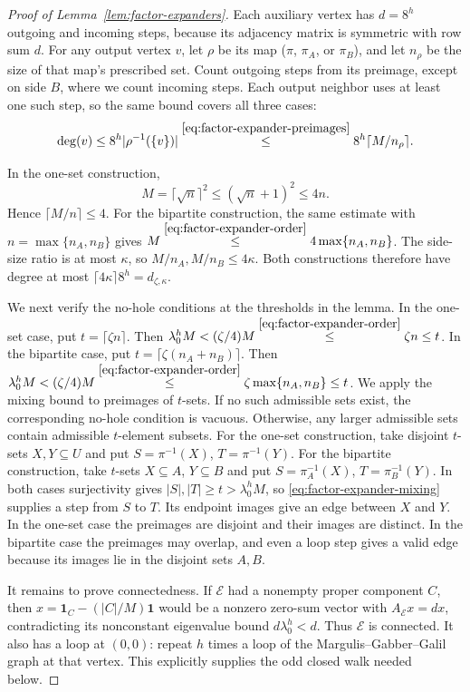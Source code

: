\begin{proof}[Proof of Lemma~\ref{lem:factor-expanders}]
Each auxiliary vertex has $d=8^h$ outgoing and incoming steps,
because its adjacency matrix is symmetric with row sum $d$.
For any output vertex $v$, let $\rho$ be its map ($\pi$, $\pi_A$,
or $\pi_B$), and let $n_\rho$ be the size of that map's prescribed
set. Count outgoing steps from its preimage, except on side $B$,
where we count incoming steps. Each output neighbor uses at least
one such step, so the same bound covers all three cases:
\[
 \deg(v)\le8^h|\rho^{-1}(\{v\})|
 \overset{\eqref{eq:factor-expander-preimages}}{\leq}
 8^h\lceil M/n_\rho\rceil.
\]

In the one-set construction,
\begin{equation}\label{eq:factor-expander-order}
 M=\lceil\sqrt n\rceil^2\le(\sqrt n+1)^2\le4n.
\end{equation}
Hence $\lceil M/n\rceil\le4$. For the bipartite construction, the
same estimate with $n=\max\{n_A,n_B\}$ gives
$M\overset{\eqref{eq:factor-expander-order}}{\leq}4\max\{n_A,n_B\}$.
The side-size ratio
is at most $\kappa$, so
$M/n_A,M/n_B\le4\kappa$. Both constructions therefore have degree
at most $\lceil4\kappa\rceil8^h=d_{\zeta,\kappa}$.

We next verify the no-hole conditions at the thresholds in the
lemma. In the one-set case, put $t=\lceil\zeta n\rceil$. Then
$\lambda_0^hM<(\zeta/4)M
\overset{\eqref{eq:factor-expander-order}}{\leq}\zeta n\le t$.
In the bipartite case, put $t=\lceil\zeta(n_A+n_B)\rceil$. Then
$\lambda_0^hM<(\zeta/4)M
\overset{\eqref{eq:factor-expander-order}}{\leq}\zeta\max\{n_A,n_B\}\le t$.
We apply the mixing bound to preimages of $t$-sets. If no such admissible sets exist, the corresponding
no-hole condition is vacuous. Otherwise, any larger admissible sets
contain admissible $t$-element subsets.
For the one-set construction, take disjoint $t$-sets $X,Y\subseteq U$
and put $S=\pi^{-1}(X)$, $T=\pi^{-1}(Y)$.
For the bipartite construction, take $t$-sets $X\subseteq A$,
$Y\subseteq B$ and put $S=\pi_A^{-1}(X)$, $T=\pi_B^{-1}(Y)$.
In both cases surjectivity gives $|S|,|T|\ge t>\lambda_0^hM$,
so \eqref{eq:factor-expander-mixing} supplies a step from $S$ to $T$.
Its endpoint images give an edge between $X$ and $Y$. In the one-set
case the preimages are disjoint and their images are distinct.
In the bipartite case the preimages may overlap, and even a loop
step gives a valid edge because its images lie in the disjoint
sets $A,B$.

It remains to prove connectedness. If $\mathcal E$ had a nonempty
proper component $C$, then
$x=\mathbf1_C-(|C|/M)\mathbf1$ would be a nonzero zero-sum vector
with $A_{\mathcal E}x=dx$, contradicting its nonconstant eigenvalue
bound $d\lambda_0^h<d$. Thus $\mathcal E$ is connected.
It also has a loop at $(0,0)$: repeat $h$ times a loop of the
Margulis--Gabber--Galil graph at that vertex. This explicitly
supplies the odd closed walk needed below.


\end{proof}
